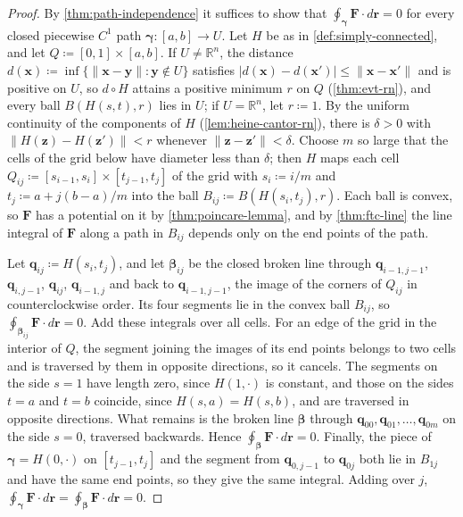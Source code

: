 \begin{proof}
By \cref{thm:path-independence} it suffices to show that $\oint_{\boldsymbol\gamma}\mathbf F\cdot d\mathbf r=0$ for every closed piecewise $C^1$ path $\boldsymbol\gamma\colon[a,b]\to U$. Let $H$ be as in \cref{def:simply-connected}, and let $Q\coloneqq[0,1]\times[a,b]$. If $U\ne\mathbb R^n$, the distance $d(\mathbf x)\coloneqq\inf\{\|\mathbf x-\mathbf y\|:\mathbf y\notin U\}$ satisfies $|d(\mathbf x)-d(\mathbf x')|\le\|\mathbf x-\mathbf x'\|$ and is positive on $U$, so $d\circ H$ attains a positive minimum $r$ on $Q$ (\cref{thm:evt-rn}), and every ball $B(H(s,t),r)$ lies in $U$; if $U=\mathbb R^n$, let $r\coloneqq1$. By the uniform continuity of the components of $H$ (\cref{lem:heine-cantor-rn}), there is $\delta>0$ with $\|H(\mathbf z)-H(\mathbf z')\|<r$ whenever $\|\mathbf z-\mathbf z'\|<\delta$. Choose $m$ so large that the cells of the grid below have diameter less than $\delta$; then $H$ maps each cell $Q_{ij}\coloneqq[s_{i-1},s_i]\times[t_{j-1},t_j]$ of the grid with $s_i\coloneqq i/m$ and $t_j\coloneqq a+j(b-a)/m$ into the ball $B_{ij}\coloneqq B(H(s_i,t_j),r)$. Each ball is convex, so $\mathbf F$ has a potential on it by \cref{thm:poincare-lemma}, and by \cref{thm:ftc-line} the line integral of $\mathbf F$ along a path in $B_{ij}$ depends only on the end points of the path.

Let $\mathbf q_{ij}\coloneqq H(s_i,t_j)$, and let $\boldsymbol\beta_{ij}$ be the closed broken line through $\mathbf q_{i-1,j-1}$, $\mathbf q_{i,j-1}$, $\mathbf q_{ij}$, $\mathbf q_{i-1,j}$ and back to $\mathbf q_{i-1,j-1}$, the image of the corners of $Q_{ij}$ in counterclockwise order. Its four segments lie in the convex ball $B_{ij}$, so $\oint_{\boldsymbol\beta_{ij}}\mathbf F\cdot d\mathbf r=0$. Add these integrals over all cells. For an edge of the grid in the interior of $Q$, the segment joining the images of its end points belongs to two cells and is traversed by them in opposite directions, so it cancels. The segments on the side $s=1$ have length zero, since $H(1,\cdot)$ is constant, and those on the sides $t=a$ and $t=b$ coincide, since $H(s,a)=H(s,b)$, and are traversed in opposite directions. What remains is the broken line $\boldsymbol\beta$ through $\mathbf q_{00},\mathbf q_{01},\ldots,\mathbf q_{0m}$ on the side $s=0$, traversed backwards. Hence $\oint_{\boldsymbol\beta}\mathbf F\cdot d\mathbf r=0$. Finally, the piece of $\boldsymbol\gamma=H(0,\cdot)$ on $[t_{j-1},t_j]$ and the segment from $\mathbf q_{0,j-1}$ to $\mathbf q_{0j}$ both lie in $B_{1j}$ and have the same end points, so they give the same integral. Adding over $j$, $\oint_{\boldsymbol\gamma}\mathbf F\cdot d\mathbf r=\oint_{\boldsymbol\beta}\mathbf F\cdot d\mathbf r=0$.
\end{proof}

